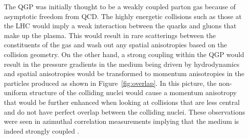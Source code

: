 %
%
%
%
%
%

The QGP was initially thought to be a weakly coupled parton gas because of asymptotic freedom from QCD. The highly energetic collisions such as those at the LHC would imply a weak interaction between the quarks and gluons that make up the plasma. This would result in rare scatterings between the constituents of the gas and wash out any spatial anisotropies based on the collision geometry. On the other hand, a strong coupling within the QGP would result in the pressure gradients in the medium being driven by hydrodynamics and spatial anisotropies would be transformed to momentum anisotropies in the particles produced as shown in Figure~\ref{fig:overlap}. In this picture, the non-uniform structure of the colliding nuclei would cause a momentum anisotropy that would be further enhanced when looking at collisions that are less central and do not have perfect overlap between the colliding nuclei. These observations were seen in azimuthal correlation measurements implying that the medium is indeed strongly coupled \cite{Aaboud:2018ves, PhysRevLett.91.182301, Sirunyan:2017fts, PhysRevLett.116.132302}. 


